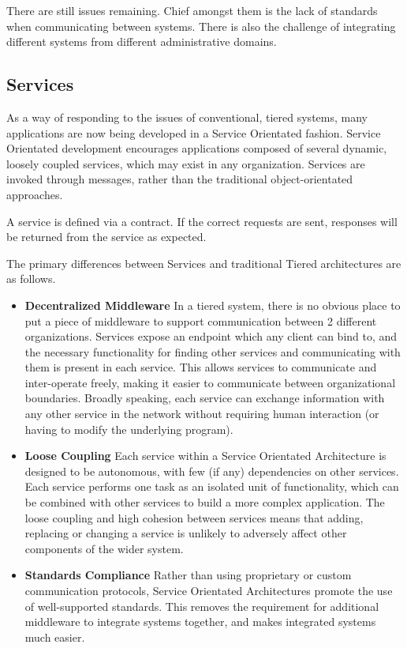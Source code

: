 \documentclass{article}
\begin{document}
There are still issues remaining. Chief amongst them is the lack of standards when communicating between systems. There is also the challenge of integrating different systems from different administrative domains. 

\subsection{Services}
As a way of responding to the issues of conventional, tiered systems, many applications are now being developed in a Service Orientated fashion. Service Orientated development encourages applications composed of several dynamic, loosely coupled services, which may exist in any organization. Services are invoked through messages, rather than the traditional object-orientated approaches.

A service is defined via a contract. If the correct requests are sent, responses will be returned from the service as expected. 

The primary differences between Services and traditional Tiered architectures are as follows.

\begin{itemize}
    \item \textbf{Decentralized Middleware}
    In a tiered system, there is no obvious place to put a piece of middleware to support communication between 2 different organizations. Services expose an endpoint which any client can bind to, and the necessary functionality for finding other services and communicating with them is present in each service. This allows services to communicate and inter-operate freely, making it easier to communicate between organizational boundaries. Broadly speaking, each service can exchange information with any other service in the network without requiring human interaction (or having to modify the underlying program).

    \item \textbf{Loose Coupling}
    Each service within a Service Orientated Architecture is designed to be autonomous, with few (if any) dependencies on other services. Each service performs one task as an isolated unit of functionality, which can be combined with other services to build a more complex application. The loose coupling and high cohesion between services means that adding, replacing or changing a service is unlikely to adversely affect other components of the wider system.

    \item \textbf{Standards Compliance}
    Rather than using proprietary or custom communication protocols, Service Orientated Architectures promote the use of well-supported standards. This removes the requirement for additional middleware to integrate systems together, and makes integrated systems much easier. 
\end{itemize}
\end{document}
